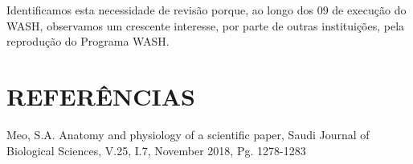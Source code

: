 \documentclass[
12pt,		%
openright,	%
twoside,  %
a4paper,			%
chapter=TITLE,		%
english,			%
french,				%
spanish,			%
brazil				%
]{USPSC-classe/USPSC}
\begin{document}
Identificamos esta necessidade de revis\~ao porque, ao longo dos 09 de execu\c{c}\~ao do WASH, observamos um crescente interesse, por parte de outras institui\c{c}\~oes, pela reprodu\c{c}\~ao do Programa WASH.









\chapter[REFER\^ENCIAS]{REFER\^ENCIAS}\label{REFER\^ENCIAS}
\begin{flushleft}
\begin{flushleft}
\begin{flushleft}
\begin{flushleft}
\begin{flushleft}
\begin{flushleft}
\begin{flushleft}
\begin{flushleft}
\begin{flushleft}
[MEO, 2018] Meo, S.A. Anatomy and physiology of a scientific paper, Saudi Journal of Biological Sciences, V.25, I.7, November 2018, Pg. 1278-1283
\end{flushleft}


\end{flushleft}


\end{flushleft}


\end{flushleft}


\end{flushleft}


\end{flushleft}


\end{flushleft}


\end{flushleft}


\end{flushleft}
\end{document}
